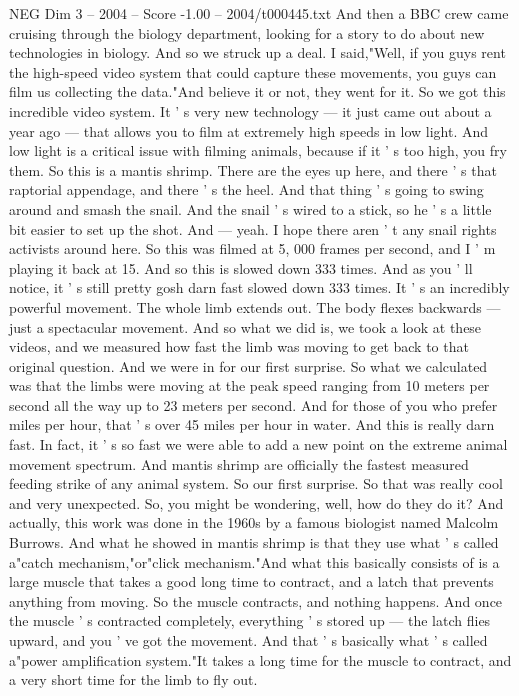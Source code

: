 \begin{textsample}{NEG Dim 3 – 2004 – Score -1.00 – 2004/t000445.txt}
And then a BBC crew came cruising through the biology department, looking for a story to do about new technologies in biology.
And so we struck up a deal.
I said,"Well, if you guys rent the high-speed video system that could capture these movements, you guys can film us collecting the data."And believe it or not, they went for it.
So we got this incredible video system.
It ' s very new technology — it just came out about a year ago — that allows you to film at extremely high speeds in low light.
And low light is a critical issue with filming animals, because if it ' s too high, you fry them.
So this is a mantis shrimp.
There are the eyes up here, and there ' s that raptorial appendage, and there ' s the heel.
And that thing ' s going to swing around and smash the snail.
And the snail ' s wired to a stick, so he ' s a little bit easier to set up the shot.
And — yeah.
I hope there aren ' t any snail rights activists around here.
So this was filmed at 5, 000 frames per second, and I ' m playing it back at 15.
And so this is slowed down 333 times.
And as you ' ll notice, it ' s still pretty gosh darn fast slowed down 333 times.
It ' s an incredibly powerful movement.
The whole limb extends out.
The body flexes backwards — just a spectacular movement.
And so what we did is, we took a look at these videos, and we measured how fast the limb was moving to get back to that original question.
And we were in for our first surprise.
So what we calculated was that the limbs were moving at the peak speed ranging from 10 meters per second all the way up to 23 meters per second.
And for those of you who prefer miles per hour, that ' s over 45 miles per hour in water.
And this is really darn fast.
In fact, it ' s so fast we were able to add a new point on the extreme animal movement spectrum.
And mantis shrimp are officially the fastest measured feeding strike of any animal system.
So our first surprise.
So that was really cool and very unexpected.
So, you might be wondering, well, how do they do it?
And actually, this work was done in the 1960s by a famous biologist named Malcolm Burrows.
And what he showed in mantis shrimp is that they use what ' s called a"catch mechanism,"or"click mechanism."And what this basically consists of is a large muscle that takes a good long time to contract, and a latch that prevents anything from moving.
So the muscle contracts, and nothing happens.
And once the muscle ' s contracted completely, everything ' s stored up — the latch flies upward, and you ' ve got the movement.
And that ' s basically what ' s called a"power amplification system."It takes a long time for the muscle to contract, and a very short time for the limb to fly out.

\end{textsample}
